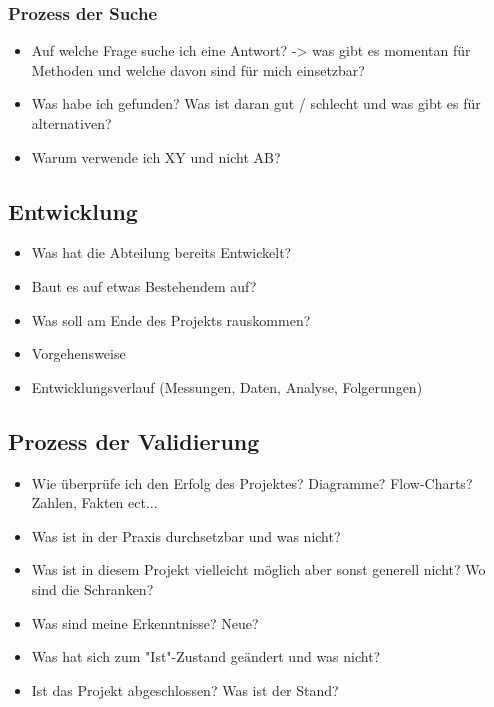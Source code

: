 \documentclass[a4paper,11pt,singlespacing]{article}
\begin{document}
			\subsubsection{Prozess der Suche}
			\label{sub:prozess_der_suche}
				\begin{itemize}
					\item Auf welche Frage suche ich eine Antwort? -> was gibt es momentan für Methoden und welche davon sind für mich einsetzbar?
					\item  Was habe ich gefunden? Was ist daran gut / schlecht und was gibt es für alternativen?
					\item Warum verwende ich XY und nicht AB?
				\end{itemize}


	\subsection{Entwicklung}
	\label{sub:entwicklung}
		\begin{itemize}
			\item Was hat die Abteilung bereits Entwickelt?
			\item Baut es auf etwas Bestehendem auf?
			\item Was soll am Ende des Projekts rauskommen?
			\item Vorgehensweise
			\item Entwicklungsverlauf (Messungen, Daten, Analyse, Folgerungen)
		\end{itemize}


	\subsection{Prozess der Validierung}
	\label{sub:prozess_der_validierung}
		\begin{itemize}
			\item Wie überprüfe ich den Erfolg des Projektes? Diagramme? Flow-Charts? Zahlen, Fakten ect...
			\item Was ist in der Praxis durchsetzbar und was nicht?
			\item Was ist in diesem Projekt vielleicht möglich aber sonst generell nicht? Wo sind die Schranken? 
			\item Was sind meine Erkenntnisse? Neue?
			\item Was hat sich zum "Ist"-Zustand geändert und was nicht?
			\item Ist das Projekt abgeschlossen? Was ist der Stand?
		\end{itemize}
\end{document}
